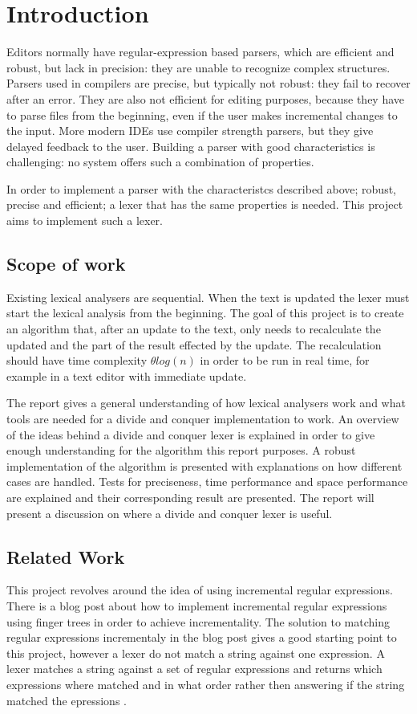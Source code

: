 \chapter{Introduction}
Editors normally have regular-expression based parsers, which are efficient and
robust, but lack in precision: they are unable to recognize complex structures.
Parsers used in compilers are precise, but typically not robust: they fail to
recover after an error. They are also not efficient for editing purposes,
because they have to parse files from the beginning, even if the user makes
incremental changes to the input. More modern IDEs use compiler strength
parsers, but they give delayed feedback to the user. Building a parser with good
characteristics is challenging: no system offers such a combination of
properties.

In order to implement a parser with the characteristcs described above; robust,
precise and efficient; a lexer that has the same properties is needed. This
project aims to implement such a lexer.

\section{Scope of work}
Existing lexical analysers are sequential. When the text is updated the lexer
must start the lexical analysis from the beginning. The goal of this project is
to create an algorithm that, after an update to the text, only needs to
recalculate the updated and the part of the result effected by the update. The
recalculation should have time complexity $\theta log(n)$ in order to be run in
real time, for example in a text editor with immediate update.

The report gives a general understanding of how lexical analysers work and what
tools are needed for a divide and conquer implementation to work. An overview of
the ideas behind a divide and conquer lexer is explained in order to give enough
understanding for the algorithm this report purposes. A robust implementation of
the algorithm is presented with explanations on how different cases are handled.
Tests for preciseness, time performance and space performance are explained and
their corresponding result are presented. The report will present a discussion
on where a divide and conquer lexer is useful.

\section{Related Work}
This project revolves around the idea of using incremental regular expressions.
There is a blog post about how to implement incremental regular expressions
using finger trees in order to achieve incrementality. The solution to matching
regular expressions incrementaly in the blog post gives a good starting point to
this project, however a lexer do not match a string against one expression. A
lexer matches a string against a set of regular expressions and returns which
expressions where matched and in what order rather then answering if the string
matched the epressions \cite{blog}.


